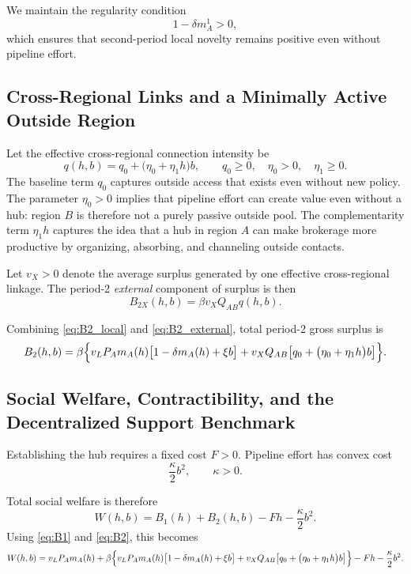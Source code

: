 We maintain the regularity condition
\begin{equation}
1-\delta m_A^1>0,
\label{eq:regularity}
\end{equation}
which ensures that second-period local novelty remains positive even without pipeline effort.

\subsection{Cross-Regional Links and a Minimally Active Outside Region}

Let the effective cross-regional connection intensity be
\begin{equation}
q(h,b)=q_0+\bigl(\eta_0+\eta_1 h\bigr)b,
\qquad
q_0\ge 0,
\quad
\eta_0>0,
\quad
\eta_1\ge 0.
\label{eq:q_b}
\end{equation}
The baseline term $q_0$ captures outside access that exists even without new policy. The parameter $\eta_0>0$ implies that pipeline effort can create value even without a hub: region $B$ is therefore not a purely passive outside pool. The complementarity term $\eta_1 h$ captures the idea that a hub in region $A$ can make brokerage more productive by organizing, absorbing, and channeling outside contacts.

Let $v_X>0$ denote the average surplus generated by one effective cross-regional linkage. The period-2 \emph{external} component of surplus is then
\begin{equation}
B_{2X}(h,b)
=
\beta v_X Q_{AB} q(h,b).
\label{eq:B2_external}
\end{equation}

Combining \eqref{eq:B2_local} and \eqref{eq:B2_external}, total period-2 gross surplus is
\begin{equation}
B_2(h,b)
=
\beta\Bigl\{
v_L P_A m_A(h)\bigl[1-\delta m_A(h)+\xi b\bigr]
+
v_X Q_{AB}\bigl[q_0+\bigl(\eta_0+\eta_1 h\bigr)b\bigr]
\Bigr\}.
\label{eq:B2}
\end{equation}

\subsection{Social Welfare, Contractibility, and the Decentralized Support Benchmark}

Establishing the hub requires a fixed cost $F>0$. Pipeline effort has convex cost
\[
\frac{\kappa}{2}b^2,
\qquad
\kappa>0.
\]

Total social welfare is therefore
\begin{equation}
W(h,b)
=
B_1(h)+B_2(h,b)-Fh-\frac{\kappa}{2}b^2.
\label{eq:W_general}
\end{equation}
Using \eqref{eq:B1} and \eqref{eq:B2}, this becomes
\begin{equation}
W(h,b)
=
v_L P_A m_A(h)
+
\beta\Bigl\{
v_L P_A m_A(h)\bigl[1-\delta m_A(h)+\xi b\bigr]
+
v_X Q_{AB}\bigl[q_0+\bigl(\eta_0+\eta_1 h\bigr)b\bigr]
\Bigr\}
-Fh-\frac{\kappa}{2}b^2.
\label{eq:W_expanded}
\end{equation}


